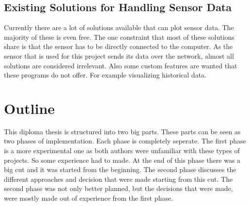 \subsection{Existing Solutions for Handling Sensor Data}

Currently there are a lot of solutions available that can plot sensor data. The majority of these is even free. The one constraint that most of these solutions share is that the sensor has to be directly connected to the computer. As the sensor that is used for this project sends its data over the network, almost all solutions are considered irrelevant. Also some custom features are wanted that these programs do not offer. For example visualizing historical data.

\section{Outline}


This diploma thesis is structured into two big parts. These parts can be seen as two phases of implementation. Each phase is completely seperate. The first phase is a more experimental one as both authors were unfamiliar with these types of projects. So some experience had to made. At the end of this phase there was a big cut and it was started from the beginning. The second phase discusses the different approaches and decision that were made starting from this cut. The second phase was not only better planned, but the decisions that were made, were mostly made out of experience from the first phase.
